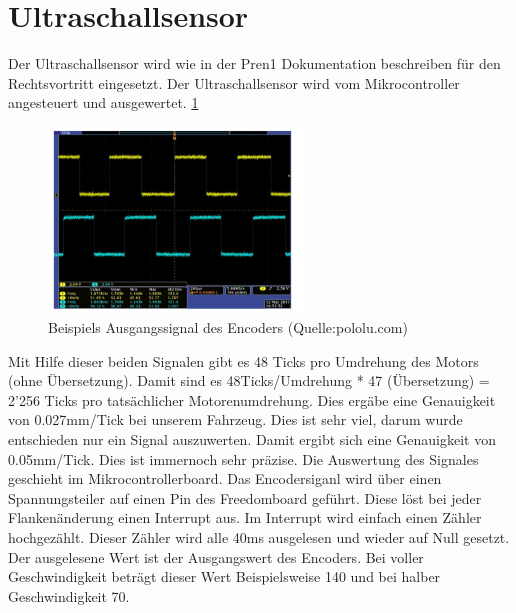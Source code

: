 \documentclass[a4paper, 10pt, fleqn]{article}
\begin{document}
\section{Ultraschallsensor}
Der Ultraschallsensor wird wie in der Pren1 Dokumentation beschreiben für den Rechtsvortritt eingesetzt. Der Ultraschallsensor wird vom Mikrocontroller angesteuert und ausgewertet. 
\ref{fig:encoder_out}
\begin{figure}[H]%
\centering
\includegraphics[width=0.6\textwidth]{Images/Encoder_Out.PNG}
\caption{Beispiels Ausgangssignal des Encoders (Quelle:pololu.com)}
\label{fig:encoder_out}
\end{figure}
Mit Hilfe dieser beiden Signalen gibt es 48 Ticks pro Umdrehung des Motors (ohne Übersetzung). Damit sind es 48Ticks/Umdrehung * 47 (Übersetzung) = 2'256 Ticks pro tatsächlicher Motorenumdrehung. Dies ergäbe eine Genauigkeit von 0.027mm/Tick bei unserem Fahrzeug. Dies ist sehr viel, darum wurde entschieden nur ein Signal auszuwerten. Damit ergibt sich eine Genauigkeit von 0.05mm/Tick. Dies ist immernoch sehr präzise.
Die Auswertung des Signales geschieht im Mikrocontrollerboard. Das Encodersiganl wird über einen Spannungsteiler auf einen Pin des Freedomboard geführt. Diese löst bei jeder Flankenänderung einen Interrupt aus. Im Interrupt wird einfach einen Zähler hochgezählt. Dieser Zähler wird alle 40ms ausgelesen und wieder auf Null gesetzt. Der ausgelesene Wert ist der Ausgangswert des Encoders. Bei voller Geschwindigkeit beträgt dieser Wert Beispielsweise 140 und bei halber Geschwindigkeit 70.
\end{document}
